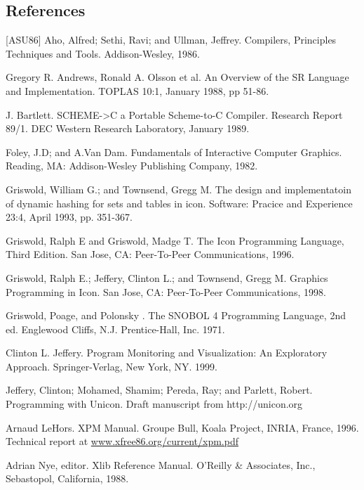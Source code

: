 \begin{noIndex}
\clearpage\section*{References}

[ASU86] Aho, Alfred; Sethi, Ravi; and Ullman, Jeffrey. Compilers,
Principles Techniques and Tools. Addison-Wesley, 1986.

\noindent
[Andrews88] Gregory R. Andrews, Ronald A. Olsson et al. An Overview of the SR
Language and Implementation. TOPLAS 10:1, January 1988, pp 51-86.

\noindent
[Bartlett 89] J. Bartlett. SCHEME-{\textgreater}C a Portable
Scheme-to-C Compiler. Research Report 89/1. DEC Western Research
Laboratory, January 1989.

\noindent
[Foley82] Foley, J.D; and A.Van Dam. Fundamentals of Interactive
Computer Graphics. Reading, MA: Addison-Wesley Publishing Company,
1982.

\noindent
[Griswold93] Griswold, William G.; and Townsend, Gregg M.
The design and implementatoin of dynamic hashing for sets
and tables in icon. Software: Pracice and Experience 23:4,
April 1993, pp. 351-367.

\noindent
[Griswold96] Griswold, Ralph E and Griswold, Madge T. The Icon
Programming Language, Third Edition. San Jose, CA: Peer-To-Peer
Communications, 1996.

\noindent
[Griswold98] Griswold, Ralph E.; Jeffery, Clinton L.; and Townsend,
Gregg M. Graphics Programming in Icon. San Jose, CA: Peer-To-Peer
Communications, 1998.

\noindent
[Griswold71] Griswold, Poage, and Polonsky . The SNOBOL 4 Programming
Language, 2nd ed. Englewood Cliffs, N.J.  Prentice-Hall, Inc. 1971.

\noindent
[Jeffery99] Clinton L. Jeffery. Program Monitoring and Visualization:
An Exploratory Approach.  Springer-Verlag, New York, NY. 1999.

\noindent
[Jeffery04] Jeffery, Clinton; Mohamed, Shamim; Pereda, Ray; and
Parlett, Robert. Programming with Unicon. Draft manuscript from
http://unicon.org

\noindent
[LeHors96] Arnaud LeHors. XPM Manual. Groupe Bull, Koala
Project, INRIA, France, 1996. Technical report at
\url{www.xfree86.org/current/xpm.pdf}

\noindent
[Nye88] Adrian Nye, editor. Xlib Reference Manual. O'Reilly \&
Associates, Inc., Sebastopol, California, 1988.


\end{noIndex}
